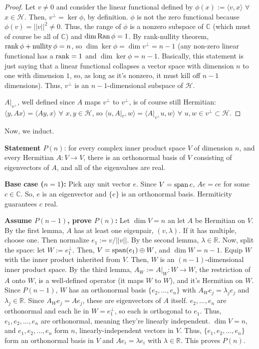 \begin{theorem}
\begin{proof}
			Let $v\ne 0$ and consider the linear functional defined by $\phi(x):=\langle v, x\rangle$ $\forall$ $x\in \mathcal{H}$. Then, $v^\perp = \ker \phi$, by definition. $\phi$ is not the zero functional because $\phi(v) = ||v||^2\ne 0$. Thus, the range of $\phi$ is a nonzero subspace of $\mathbb{C}$ (which must of course be all of $\mathbb{C}$) and $\dim\operatorname{Ran} \phi=1$. By rank-nullity theorem, $\operatorname{rank} \phi + \operatorname{nullity}\phi = n$, so $\dim\ker \phi = \dim v^\perp = n-1$ (any non-zero linear functional has a $\operatorname{rank}=1$ and $\dim\ker\phi = n-1$. Basically, this statement is just saying that a linear functional collapses a vector space with dimension $n$ to one with dimension $1$, so, as long as it's nonzero, it must kill off $n-1$ dimensions). Thus, $v^\perp$ is an $n-1$-dimensional subspace of $\mathcal{H}$.
			
			$A|_{v^\perp}$, well defined since $A$ maps $v^\perp$ to $v^\perp$, is of course still Hermitian: $\langle y, Ax\rangle = \langle A y, x\rangle$ $\forall$ $x,y\in \mathcal{H}$, so $\langle u, A|_{v^\perp}w\rangle = \langle A|_{v^\perp} u, w\rangle$ $\forall$ $u, w\in v^\perp\subset \mathcal{H}$.
		\end{proof}
		Now, we induct.
		
		\textbf{Statement $P(n)$}: for every complex inner product space $V$ of dimension $n$, and every Hermitian $A: V\rightarrow V$, there is an orthonormal basis of $V$ consisting of eigenvectors of $A$, and all of the eigenvalues are real. 
		
		\textbf{Base case ($n=1$):} Pick any unit vector $e$. Since $V=\operatorname{span}{e}$, $Ae = ce$ for some $c\in\mathbb{C}$. So, $e$ is an eigenvector and $\{e\}$ is an orthonormal basis. Hermiticity guarantees $c$ real.
	
		\textbf{Assume $P(n-1)$, prove $P(n)$:} Let $\dim V=n$ an let $A$ be Hermitian on $V$. By the first lemma, $A$ has at least one eigenpair, $(v, \lambda)$. If it has multiple, choose one. Then normalize $e_1:=v/||v||$. By the second lemma, $\lambda\in\mathbb{R}$. Now, split the space: let $W:= e_1^\perp$. Then, $V=\operatorname{span}(e_1)\oplus W$, and $\dim W = n-1$. Equip $W$ with the inner product inherited from $V$. Then, $W$ is an $(n-1)$-dimensional inner product space. By the third lemma, $A_W:=A|_W:W\rightarrow W$, the restriction of $A$ onto $W$, is a well-defined operator (it maps $W$ to $W$), and it's Hermitian on $W$. Since $P(n-1)$, $W$ has an orthonormal basis $\{e_2, \dots, e_n\}$ with $A_We_j = \lambda_j e_j$ and $\lambda_j\in\mathbb{R}$. Since $A_We_j = Ae_j$, these are eigenvectors of $A$ itself. $e_2, \dots, e_n$ are orthonormal and each lie in $W=e_1^\perp$, so each is orthogonal to $e_1$. Thus, $e_1, e_2,\dots, e_n$ are orthonormal, meaning they're linearly independent. $\dim V=n$, and $e_1, e_2, \dots, e_n$ form $n$, linearly-independent vectors in $V$. Thus, $\{e_1, e_2, \dots, e_n\}$ form an orthonormal basis in $V$ and $Ae_i = \lambda e_i$ with $\lambda\in\mathbb{R}$. This proves $P(n)$.
	\end{theorem}
	
